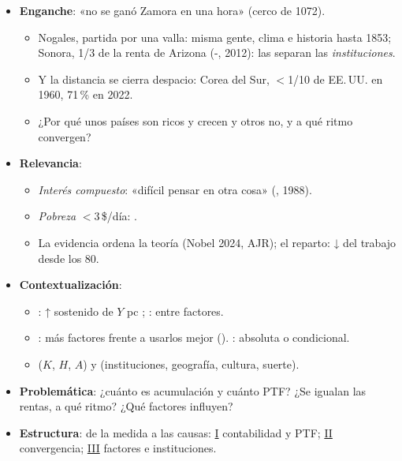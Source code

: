 \documentclass{article}
\begin{document}
\cabecerarepaso
\begin{columnas}

\begin{itemize}
\item \textbf{Enganche}: «no se ganó Zamora en una hora» (cerco de 1072).
  \begin{itemize}
  \item Nogales, partida por una valla: misma gente, clima e historia hasta 1853; Sonora, 1/3 de la renta de Arizona (-, 2012): las separan las \emph{instituciones}.
  \item Y la distancia se cierra despacio: Corea del Sur, $<$1/10 de EE.\,UU. en 1960, 71\,\% en 2022.
  \item ¿Por qué unos países son ricos y crecen y otros no, y a qué ritmo convergen?
  \end{itemize}
\item \textbf{Relevancia}:
  \begin{itemize}
  \item \emph{Interés compuesto}: «difícil pensar en otra cosa» (, 1988).
  \item \emph{Pobreza} $<$3\,\$/día: .
  \item La evidencia ordena la teoría (Nobel 2024, AJR); el reparto: ↓ del trabajo desde los 80.
  \end{itemize}
\item \textbf{Contextualización}:
  \begin{itemize}
  \item {}: ↑ sostenido de $Y$ pc  ; : entre factores.
  \item {}: más factores frente a usarlos mejor (). : absoluta o condicional.
  \item {} ($K$, $H$, $A$) y  (instituciones, geografía, cultura, suerte).
  \end{itemize}
\item \textbf{Problemática}: ¿cuánto es acumulación y cuánto PTF? ¿Se igualan las rentas, a qué ritmo? ¿Qué factores influyen?
\item \textbf{Estructura}: de la medida a las causas: \hyperref[rep:I]{I} contabilidad y PTF; \hyperref[rep:II]{II} convergencia; \hyperref[rep:III]{III} factores e instituciones.

\end{itemize}
\end{columnas}
\end{document}
